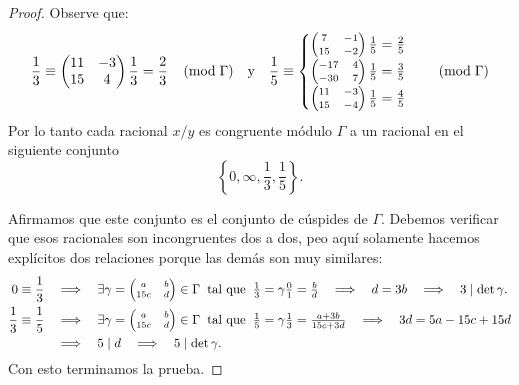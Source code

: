 \documentclass[../../tesis_maestria]{subfiles}
\begin{document}
\begin{proof}
  Observe que:
  \[
    \frac{1}{3}\equiv\begin{pmatrix}11 & -3\\ 15 & 4\end{pmatrix}\frac{1}{3}=\frac{2}{3}\;\;\;\;(\mathrm{mod}\; \Gamma)\quad\text{y}\quad
    \frac{1}{5}\equiv
    \begin{cases}
      \scriptsize \begin{pmatrix}7 & -1\\ 15 & -2\end{pmatrix}\normalsize\frac{1}{5}=\frac{2}{5} \\
      \scriptsize \begin{pmatrix}-17 & 4\\ -30 & 7\end{pmatrix}\normalsize\frac{1}{5}=\frac{3}{5}\\
      \scriptsize \begin{pmatrix}11 & -3\\ 15 & -4\end{pmatrix}\normalsize\frac{1}{5}=\frac{4}{5}
    \end{cases}\;\;\;\;(\mathrm{mod}\; \Gamma)
  \]
  Por lo tanto cada racional $x/y$ es congruente m\'odulo $\Gamma$ a un racional en el siguiente
  conjunto
  \[
    \left\{0,\infty,\frac{1}{3},\frac{1}{5}\right\}.
  \]

  Afirmamos que este conjunto es el conjunto de c\'uspides de $\Gamma$. Debemos
  verificar que esos racionales son incongruentes dos a dos, peo aqu\'i solamente hacemos expl\'icitos
  dos relaciones porque las dem\'as son muy similares:
  \begin{align*}
    0\equiv\frac{1}{3}
    &\quad\Longrightarrow\quad \exists \gamma=\scriptsize \begin{pmatrix}a & b\\ 15c & d\end{pmatrix}\normalsize\in\Gamma\;\;\text{tal que}\;\;
      \tfrac{1}{3}=\gamma\tfrac{0}{1}=\tfrac{b}{d}
    \quad\Longrightarrow\quad d=3b\quad\Longrightarrow\quad 3\mid\det\gamma.\\
    \frac{1}{3}\equiv\frac{1}{5}
    &\quad\Longrightarrow\quad \exists \gamma=\scriptsize \begin{pmatrix}a & b\\ 15c & d\end{pmatrix}\normalsize\in\Gamma\;\;\text{tal que}\;\;
      \tfrac{1}{5}=\gamma\tfrac{1}{3}=\tfrac{a+3b}{15c+3d}
      \quad\Longrightarrow\quad 3d=5a-15c+15d\\
    &\quad\Longrightarrow\quad 5\mid d\quad\Longrightarrow\quad 5\mid\det\gamma.
  \end{align*}
  Con esto terminamos la prueba.
\end{proof}
\end{document}
